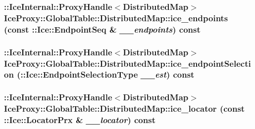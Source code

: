 \label{class_ice_proxy_1_1_global_table_1_1_distributed_map_ac4681d7d3ef795e9ebff8c3de27a2689}
\hypertarget{class_ice_proxy_1_1_global_table_1_1_distributed_map_a6f435f8be93ddc73bc4d956a03a341bb}{
\subsubsection[{ice\_\-endpoints}]{\setlength{\rightskip}{0pt plus 5cm}::IceInternal::ProxyHandle$<${\bf DistributedMap}$>$ IceProxy::GlobalTable::DistributedMap::ice\_\-endpoints (const ::Ice::EndpointSeq \& {\em \_\-\_\-endpoints}) const}}
\label{class_ice_proxy_1_1_global_table_1_1_distributed_map_a6f435f8be93ddc73bc4d956a03a341bb}
\hypertarget{class_ice_proxy_1_1_global_table_1_1_distributed_map_acae9aa55410a5979b7e3a249106ee77c}{
\subsubsection[{ice\_\-endpointSelection}]{\setlength{\rightskip}{0pt plus 5cm}::IceInternal::ProxyHandle$<${\bf DistributedMap}$>$ IceProxy::GlobalTable::DistributedMap::ice\_\-endpointSelection (::Ice::EndpointSelectionType {\em \_\-\_\-est}) const}}
\label{class_ice_proxy_1_1_global_table_1_1_distributed_map_acae9aa55410a5979b7e3a249106ee77c}
\hypertarget{class_ice_proxy_1_1_global_table_1_1_distributed_map_a2948cd5ff5bda870a2d0240e6cfacb13}{
\subsubsection[{ice\_\-locator}]{\setlength{\rightskip}{0pt plus 5cm}::IceInternal::ProxyHandle$<${\bf DistributedMap}$>$ IceProxy::GlobalTable::DistributedMap::ice\_\-locator (const ::Ice::LocatorPrx \& {\em \_\-\_\-locator}) const}}
